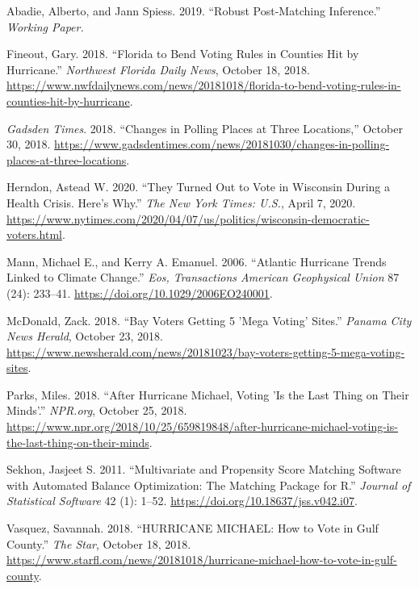 \documentclass[
  12pt,
]{article}
\newlength{\cslhangindent}
\newenvironment{cslreferences}%
  {\setlength{\parindent}{0pt}%
  \everypar{\setlength{\hangindent}{\cslhangindent}}\ignorespaces}%
  {\par}
\begin{document}
\hypertarget{refs}{}
\begin{cslreferences}
\leavevmode\hypertarget{ref-Abadie2019}{}%
Abadie, Alberto, and Jann Spiess. 2019. ``Robust Post-Matching Inference.'' \emph{Working Paper.}

\leavevmode\hypertarget{ref-Fineout2018}{}%
Fineout, Gary. 2018. ``Florida to Bend Voting Rules in Counties Hit by Hurricane.'' \emph{Northwest Florida Daily News}, October 18, 2018. \url{https://www.nwfdailynews.com/news/20181018/florida-to-bend-voting-rules-in-counties-hit-by-hurricane}.

\leavevmode\hypertarget{ref-gadsdentimes2018}{}%
\emph{Gadsden Times}. 2018. ``Changes in Polling Places at Three Locations,'' October 30, 2018. \url{https://www.gadsdentimes.com/news/20181030/changes-in-polling-places-at-three-locations}.

\leavevmode\hypertarget{ref-Herndon2020}{}%
Herndon, Astead W. 2020. ``They Turned Out to Vote in Wisconsin During a Health Crisis. Here's Why.'' \emph{The New York Times: U.S.}, April 7, 2020. \url{https://www.nytimes.com/2020/04/07/us/politics/wisconsin-democratic-voters.html}.

\leavevmode\hypertarget{ref-Mann2006}{}%
Mann, Michael E., and Kerry A. Emanuel. 2006. ``Atlantic Hurricane Trends Linked to Climate Change.'' \emph{Eos, Transactions American Geophysical Union} 87 (24): 233--41. \url{https://doi.org/10.1029/2006EO240001}.

\leavevmode\hypertarget{ref-McDonald2018}{}%
McDonald, Zack. 2018. ``Bay Voters Getting 5 'Mega Voting' Sites.'' \emph{Panama City News Herald}, October 23, 2018. \url{https://www.newsherald.com/news/20181023/bay-voters-getting-5-mega-voting-sites}.

\leavevmode\hypertarget{ref-Parks2018}{}%
Parks, Miles. 2018. ``After Hurricane Michael, Voting 'Is the Last Thing on Their Minds'.'' \emph{NPR.org}, October 25, 2018. \url{https://www.npr.org/2018/10/25/659819848/after-hurricane-michael-voting-is-the-last-thing-on-their-minds}.

\leavevmode\hypertarget{ref-Sekhon2011}{}%
Sekhon, Jasjeet S. 2011. ``Multivariate and Propensity Score Matching Software with Automated Balance Optimization: The Matching Package for R.'' \emph{Journal of Statistical Software} 42 (1): 1--52. \url{https://doi.org/10.18637/jss.v042.i07}.

\leavevmode\hypertarget{ref-Vasquez2018}{}%
Vasquez, Savannah. 2018. ``HURRICANE MICHAEL: How to Vote in Gulf County.'' \emph{The Star}, October 18, 2018. \url{https://www.starfl.com/news/20181018/hurricane-michael-how-to-vote-in-gulf-county}.


\end{cslreferences}
\end{document}

